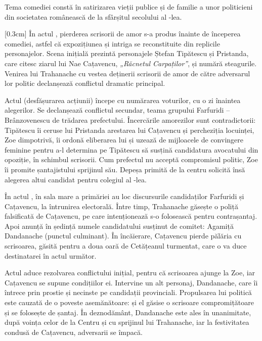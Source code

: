 Tema comediei constă în satirizarea vieții publice și de familie a unor politicieni din societatea românească de la sfârșitul secolului al -lea.

[0.3cm]
În actul , pierderea scrisorii de amor s-a produs înainte de începerea comediei, astfel că expozițiunea și intriga se reconstituite din replicile personajelor. Scena inițială prezintă personajele Ștefan Tipătescu și Pristanda, care citesc ziarul lui Nae Cațavencu, \textit{„Răcnetul Carpaților”}, și numără steagurile. Venirea lui Trahanache cu vestea deținerii scrisorii de amor de către adversarul lor politic declanșează conflictul dramatic principal.

Actul  (desfășurarea acțiunii) începe cu numărarea voturilor, cu o zi înaintea alegerilor. Se declanșează conflictul secundar, teama grupului Farfuridi -- Brânzovenescu de trădarea prefectului. Încercările amorezilor sunt contradictorii: Tipătescu îi ceruse lui Pristanda arestarea lui Cațavencu și percheziția locuinței, Zoe dimpotrivă, îi ordonă eliberarea lui și uzează de mijloacele de convingere feminine pentru a-l determina pe Tipătescu să susțină candidatura avocatului din opoziție, în schimbul scrisorii. Cum prefectul nu acceptă compromisul politic, Zoe îi promite șantajistului sprijinul său. Depeșa primită de la centru solicită însă alegerea altui candidat pentru colegiul al \hbox{-lea}.

În actul , în sala mare a primăriei au loc discursurile candidaților Farfuridi și Cațavencu, la întrunirea electorală. Între timp, Trahanache găsește o poliță falsificată de Cațavencu, pe care intenționează s-o folosească pentru contrașantaj. Apoi anunță în ședință numele candidatului susținut de comitet: Agamiță Dandanache (punctul culminant). În încăierare, Cațavencu pierde pălăria cu scrisoarea, găsită pentru a doua oară de Cetățeanul turmentat, care o va duce destinatarei în actul următor.

Actul  aduce rezolvarea conflictului inițial, pentru că scrisoarea ajunge la Zoe, iar Cațavencu se supune condițiilor ei. Intervine un alt personaj, Dandanache, care îi întrece prin prostie și necinste pe candidații provinciali. Propulsarea lui politică este cauzată de o poveste asemănătoare: și el găsise o scrisoare compromițătoare și se folosește de șantaj. În deznodământ, Dandanache este ales în unanimitate, după voința celor de la Centru și cu sprijinul lui Trahanache, iar la festivitatea condusă de Cațavencu, adversarii se împacă.

